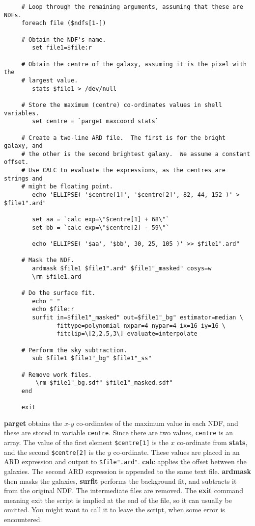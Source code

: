 \documentclass[twoside,11pt]{article}
\newcommand{\htmlref}[2]{#1}
\newcommand{\xref}[3]{#1}
\begin{document}
\small
\begin{verbatim}
     # Loop through the remaining arguments, assuming that these are NDFs.
     foreach file ($ndfs[1-])

     # Obtain the NDF's name.
        set file1=$file:r

     # Obtain the centre of the galaxy, assuming it is the pixel with the
     # largest value.
        stats $file1 > /dev/null

     # Store the maximum (centre) co-ordinates values in shell variables.
        set centre = `parget maxcoord stats`

     # Create a two-line ARD file.  The first is for the bright galaxy, and
     # the other is the second brightest galaxy.  We assume a constant offset.
     # Use CALC to evaluate the expressions, as the centres are strings and
     # might be floating point.
        echo 'ELLIPSE( '$centre[1]', '$centre[2]', 82, 44, 152 )' > $file1".ard"

        set aa = `calc exp=\"$centre[1] + 68\"`
        set bb = `calc exp=\"$centre[2] - 59\"`

        echo 'ELLIPSE( '$aa', '$bb', 30, 25, 105 )' >> $file1".ard"

     # Mask the NDF.
        ardmask $file1 $file1".ard" $file1"_masked" cosys=w
        \rm $file1.ard

     # Do the surface fit.
        echo " "
        echo $file:r
        surfit in=$file1"_masked" out=$file1"_bg" estimator=median \
               fittype=polynomial nxpar=4 nypar=4 ix=16 iy=16 \
               fitclip=\[2,2.5,3\] evaluate=interpolate 

     # Perform the sky subtraction.
        sub $file1 $file1"_bg" $file1"_ss"

     # Remove work files.
         \rm $file1"_bg.sdf" $file1"_masked.sdf"
     end

     exit
\end{verbatim}
\normalsize
\xref{{\bf parget}}{sun95}{PARGET} obtains the $x$-$y$ co-ordinates of
the maximum value in each NDF, and these are stored in variable {\tt centre}.
Since there are two values, {\tt centre} is an array.  The value of
the first element {\tt \$centre[1]} is the $x$ co-ordinate from
\xref{{\bf stats}}{sun95}{STATS}, and the second {\tt \$centre[2]} is
the $y$ co-ordinate.  These values are placed in an \htmlref{{\sf
ARD}}{sc4_gl_ard} expression and output to {\tt \$file".ard"}.
\xref{{\bf calc}}{sun95}{CALC} applies the offset between the galaxies.  The
second ARD expression is appended to the same text file.  \xref{{\bf
ardmask}}{sun95}{ARDMASK} then masks the galaxies, \xref{{\bf
surfit}}{sun95}{SURFIT} performs the background fit, and subtracts it from the
original NDF.  The intermediate files are removed.  The {\bf exit}
command meaning exit the script is implied at the end of the file, so it
can usually be omitted.  You might want to call it to leave the script,
when some error is encountered.
\end{document}
